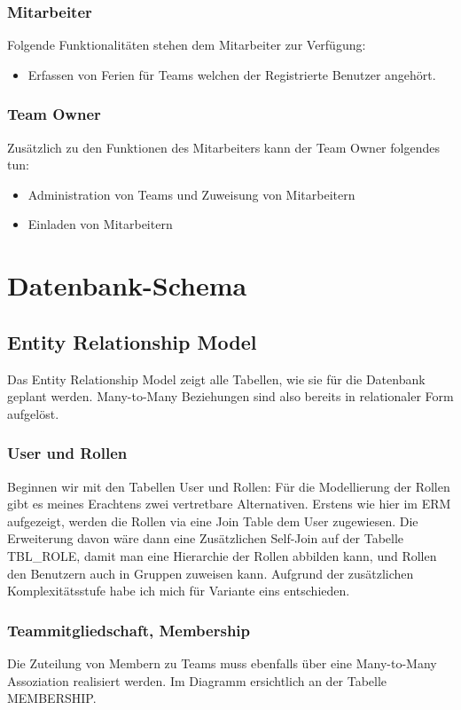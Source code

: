 \subsubsection{Mitarbeiter}
Folgende Funktionalit\"aten stehen dem Mitarbeiter zur Verf\"ugung:
\begin{itemize}
\item Erfassen von Ferien f\"ur Teams welchen der Registrierte Benutzer angeh\"ort.
\end{itemize}

\subsubsection{Team Owner}
Zus\"atzlich zu den Funktionen des Mitarbeiters kann der Team Owner folgendes tun:
\begin{itemize}
\item Administration von Teams und Zuweisung von Mitarbeitern
\item Einladen von Mitarbeitern
\end{itemize}

\section{Datenbank-Schema}
\subsection{Entity Relationship Model}
Das Entity Relationship Model zeigt alle Tabellen, wie sie für die Datenbank geplant werden. Many-to-Many Beziehungen sind also bereits in relationaler Form aufgel\"ost. 

\subsubsection{User und Rollen}
Beginnen wir mit den Tabellen User und Rollen: F\"ur die Modellierung der Rollen gibt es meines Erachtens zwei vertretbare Alternativen. Erstens wie hier im ERM aufgezeigt, werden die Rollen via eine Join Table dem User zugewiesen. Die Erweiterung davon w\"are dann eine Zus\"atzlichen Self-Join auf der Tabelle TBL\_ROLE, damit man eine Hierarchie der Rollen abbilden kann, und Rollen den Benutzern auch in Gruppen zuweisen kann. Aufgrund der zus\"atzlichen Komplexit\"atsstufe habe ich mich f\"ur Variante eins entschieden.

\subsubsection{Teammitgliedschaft, Membership}
Die Zuteilung von Membern zu Teams muss ebenfalls \"uber eine Many-to-Many Assoziation realisiert werden. Im Diagramm ersichtlich an der Tabelle MEMBERSHIP. 

